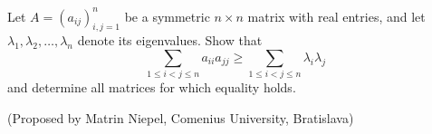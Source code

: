 Let $A=(a_{ij})_{i, j=1}^n$ be a symmetric $n\times n$ matrix with real entries, and let $\lambda _1, \lambda _2, \dots, \lambda _n$ denote its eigenvalues. Show that
$$\sum_{1\le i<j\le n} a_{ii}a_{jj}\ge \sum_{1\le i < j\le n} \lambda _i \lambda _j$$and determine all matrices for which equality holds.

(Proposed by Matrin Niepel, Comenius University, Bratislava)